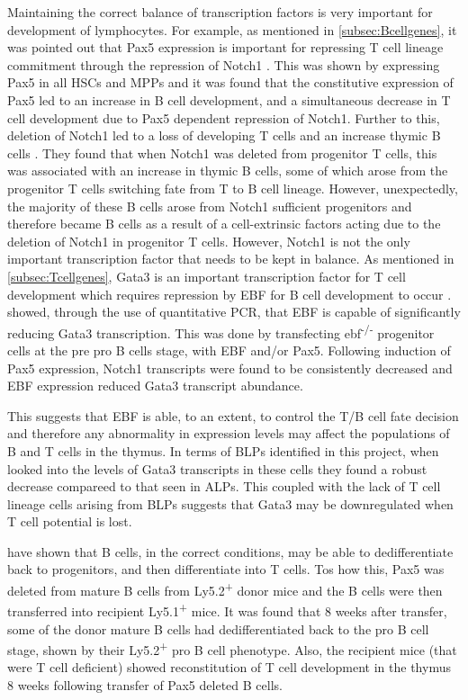 Maintaining the correct balance of transcription factors is very important for development of lymphocytes. 
For example, as mentioned in \cref{subsec:Bcellgenes}, it was pointed out that Pax5 expression is important for repressing T cell lineage commitment through the repression of Notch1 \citep{Souabni2002}.
This was shown by expressing Pax5 in all HSCs and MPPs and it was found that the constitutive expression of Pax5 led to an increase in B cell development, and a simultaneous decrease in T cell development due to Pax5 dependent repression of Notch1.
Further to this, deletion of Notch1 led to a loss of developing T cells and an increase thymic B cells \citep{Feyerabend2009}.
They found that when Notch1 was deleted from progenitor T cells, this was associated with an increase in thymic B cells, some of which arose from the progenitor T cells switching fate from T to B cell lineage.
However, unexpectedly, the majority of these B cells arose from Notch1 sufficient progenitors and therefore became B cells as a result of a cell-extrinsic factors acting due to the deletion of Notch1 in progenitor T cells.
However, Notch1 is not the only important transcription factor that needs to be kept in balance.
As mentioned in \cref{subsec:Tcellgenes}, Gata3 is an important transcription factor for T cell development which requires repression by EBF for B cell development to occur \citep{Banerjee2013}.
\citet{Banerjee2013} showed, through the use of quantitative PCR, that EBF is capable of significantly reducing Gata3 transcription.
This was done by transfecting ebf\textsuperscript{-/-} progenitor cells at the pre pro B cells stage, with EBF and/or Pax5.
Following induction of Pax5 expression, Notch1 transcripts were found to be consistently decreased and EBF expression reduced Gata3 transcript abundance.

This suggests that EBF is able, to an extent, to control the T/B cell fate decision and therefore any abnormality in expression levels may affect the populations of B and T cells in the thymus.
In terms of BLPs identified in this project, when \citet{Banerjee2013} looked into the levels of Gata3 transcripts in these cells they found a robust decrease compareed to that seen in ALPs.
This coupled with the lack of T cell lineage cells arising from BLPs suggests that Gata3 may be downregulated when T cell potential is lost.

\citet{Cobaleda2007} have shown that B cells, in the correct conditions, may be able to dedifferentiate back to progenitors, and then differentiate into T cells.
Tos how this, Pax5 was deleted from mature B cells from Ly5.2\textsuperscript{+} donor mice and the B cells were then transferred into recipient Ly5.1\textsuperscript{+} mice.
It was found that 8 weeks after transfer, some of the donor mature B cells had dedifferentiated back to the pro B cell stage, shown by their Ly5.2\textsuperscript{+} pro B cell phenotype.
Also, the recipient mice (that were T cell deficient) showed reconstitution of T cell development in the thymus 8 weeks following transfer of Pax5 deleted B cells.


